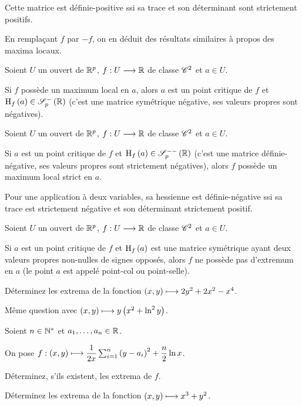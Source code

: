 Cette matrice est définie-positive ssi sa trace et son déterminant sont strictement positifs.

En remplaçant \(f\) par \(-f\), on en déduit des résultats similaires à propos des maxima locaux.

\begin{prop}
Soient \(U\) un ouvert de \(\mathbb{R}^p\), \(f:U\longrightarrow\mathbb{R}\) de classe \(\mathscr{C}^{2}\) et \(a\in U\).

Si \(f\) possède un maximum local en \(a\), alors \(a\) est un point critique de \(f\) et \(\hessienne{f}\paren{a}\in\symneg{p}[\R]\) (\ie c'est une matrice symétrique négative, ses valeurs propres sont négatives).
\end{prop}

\begin{prop}
Soient \(U\) un ouvert de \(\mathbb{R}^p\), \(f:U\longrightarrow\mathbb{R}\) de classe \(\mathscr{C}^{2}\) et \(a\in U\).

Si \(a\) est un point critique de \(f\) et \(\hessienne{f}\paren{a}\in\symdefneg{p}[\R]\) (\ie c'est une matrice définie-négative, ses valeurs propres sont strictement négatives), alors \(f\) possède un maximum local strict en \(a\).
\end{prop}

Pour une application à deux variables, sa hessienne est définie-négative ssi sa trace est strictement négative et son déterminant strictement positif.

\begin{prop}
Soient \(U\) un ouvert de \(\mathbb{R}^p\), \(f:U\longrightarrow\mathbb{R}\) de classe \(\mathscr{C}^{2}\) et \(a\in U\).

Si \(a\) est un point critique de \(f\) et \(\operatorname{H}_{f}\left(a\right)\) est une matrice symétrique ayant deux valeurs propres non-nulles de signes opposés, alors \(f\) ne possède pas d'extremum en \(a\) (le point \(a\) est appelé point-col ou point-selle).
\end{prop}

\begin{exo}
Déterminez les extrema de la fonction \(\left(x,y\right)\longmapsto2y^2+2x^2-x^4\).
\end{exo}

\begin{exo}
Même question avec \(\left(x,y\right)\longmapsto y\left(x^2+\ln^2y\right)\).
\end{exo}

\begin{exo}
Soient \(n\in\mathbb{N}^*\) et \(a_1,\dots,a_n\in\mathbb{R}\).

On pose \(f:\left(x,y\right)\longmapsto\dfrac{1}{2x}\sum_{i=1}^n\left(y-a_i\right)^2+\dfrac{n}{2}\ln x\).

Déterminez, s'ils existent, les extrema de \(f\).
\end{exo}

\begin{exo}
Déterminez les extrema de la fonction \(\left(x,y\right)\longmapsto x^3+y^2\).
\end{exo}
